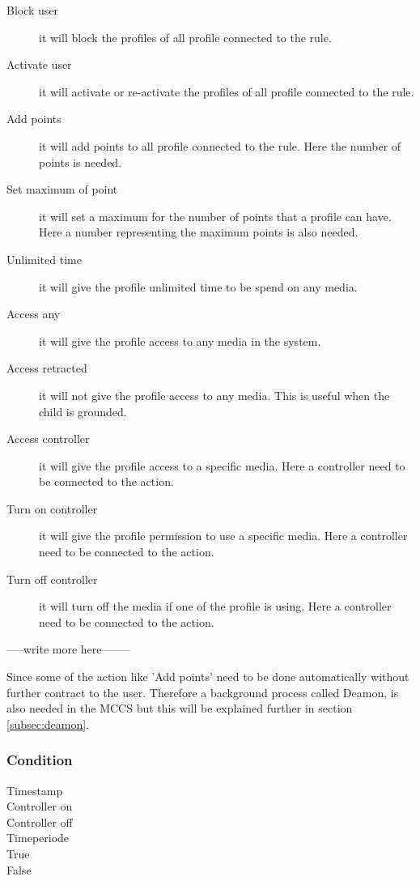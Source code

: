 \begin{description}
	\item[Block user] it will block the profiles of all profile connected to the rule.
	\item[Activate user] it will activate or re-activate the profiles of all profile connected to the rule.
	\item[Add points] it will add points to all profile connected to the rule. Here the number of points is needed.
	\item[Set maximum of point] it will set a maximum for the number of points that a profile can have. Here a number representing the maximum points is also needed. 
	\item[Unlimited time] it will give the profile unlimited time to be spend on any media. 
	\item[Access any] it will give the profile access to any media in the system.
	\item[Access retracted] it will not give the profile access to any media. This is useful when the child is grounded.
	\item[Access controller] it will give the profile access to a specific media. Here a controller need to be connected to the action.
	\item[Turn on controller] it will give the profile permission to use a specific media. Here a controller need to be connected to the action.
	\item[Turn off controller] it will turn off the media if one of the profile is using. Here a controller need to be connected to the action.
\end{description}
		
-----write more here--------

Since some of the action like 'Add points' need to be done automatically without further contract to the user. Therefore a background process called Deamon, is also needed in the MCCS but this will be explained further in section \ref{subsec:deamon}. 
	
	
\subsubsection{Condition}


\begin{description}
		\item[Timestamp] 
		\item[Controller on]
		\item[Controller off]
		\item[Timeperiode]
		\item[True]
		\item[False] 
	\end{description}


